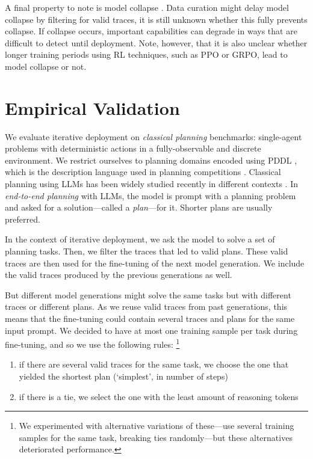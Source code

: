 \documentclass{article}
\newcommand{\egcite}[1]{\citep[e.g.,][]{#1}}
\begin{document}
A final property to note is model collapse \citep{shumailov-et-al-nature2024}. Data
curation might delay model collapse by filtering for valid traces, it is still
unknown whether this fully prevents collapse. If collapse
occurs, important capabilities can degrade in ways that are difficult to
detect until deployment. Note, however, that it is also unclear whether
longer training periods using RL techniques, such as PPO or GRPO, lead to model
collapse or not.



\section{Empirical Validation}

We evaluate iterative deployment on \emph{classical planning} benchmarks: single-agent problems
with deterministic actions in a fully-observable and discrete environment. We
restrict ourselves to planning domains encoded using PDDL
\citep{mcdermott-et-al-tr1998,haslum-et-al-2019}, which is the description
language used in planning competitions \citep{taitler-et-al-aimag2024}.
Classical planning using LLMs has been widely studied recently in different contexts
\egcite{valmeekam-et-al-neurips2023,stechly-et-al-neurips2024,katz-et-al-neurips2024}. In
\emph{end-to-end planning} with LLMs, the model is prompt with a planning
problem and asked for a solution---called a \emph{plan}---for it. Shorter plans
are usually preferred.

In the context of iterative deployment, we ask the model to solve a set of
planning tasks. Then, we filter the traces that led to valid plans. These valid
traces are then used for the fine-tuning of the next model generation. We include the
valid traces produced by the previous generations as well.

But different model generations might solve the same tasks but with different traces
or different plans. As we reuse valid traces from past generations, this
means that the fine-tuning could contain several traces and plans for the same
input prompt. We decided to have at most one training sample per task during
fine-tuning, and so we use the following rules:
\footnote{
We experimented with alternative variations of these---use several
training samples for the same task, breaking ties randomly---but these
alternatives deteriorated performance. }


\begin{enumerate}
\item if there are several valid traces for the same task, we choose the one that yielded the shortest plan (`simplest', in number of steps)
\item if there is a tie, we select the one with the least amount of reasoning tokens
\end{enumerate}
\end{document}
